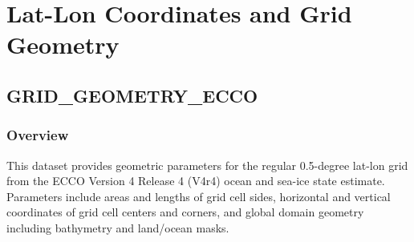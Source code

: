 \section{Lat-Lon Coordinates and Grid Geometry}
\subsection{GRID\_GEOMETRY\_ECCO}
\subsubsection{Overview}
\newp
This dataset provides geometric parameters for the regular 0.5-degree lat-lon grid from the ECCO Version 4 Release 4 (V4r4) ocean and sea-ice state estimate. Parameters include areas and lengths of grid cell sides, horizontal and vertical coordinates of grid cell centers and corners, and global domain geometry including bathymetry and land/ocean masks.
\\\\
